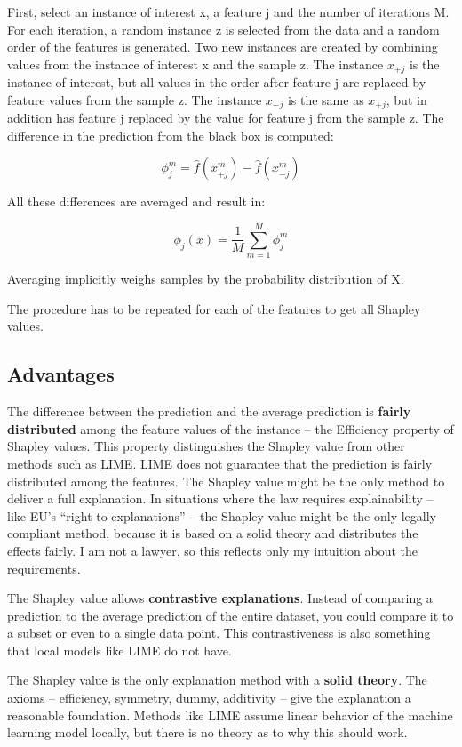 \documentclass[12pt,]{krantz}
\begin{document}
First, select an instance of interest x, a feature j and the number of
iterations M. For each iteration, a random instance z is selected from
the data and a random order of the features is generated. Two new
instances are created by combining values from the instance of interest
x and the sample z. The instance \(x_{+j}\) is the instance of interest,
but all values in the order after feature j are replaced by feature
values from the sample z. The instance \(x_{-j}\) is the same as
\(x_{+j}\), but in addition has feature j replaced by the value for
feature j from the sample z. The difference in the prediction from the
black box is computed:

\[\phi_j^{m}=\hat{f}(x^m_{+j})-\hat{f}(x^m_{-j})\]

All these differences are averaged and result in:

\[\phi_j(x)=\frac{1}{M}\sum_{m=1}^M\phi_j^{m}\]

Averaging implicitly weighs samples by the probability distribution of
X.

The procedure has to be repeated for each of the features to get all
Shapley values.

\subsection{Advantages}\label{advantages-16}

The difference between the prediction and the average prediction is
\textbf{fairly distributed} among the feature values of the instance --
the Efficiency property of Shapley values. This property distinguishes
the Shapley value from other methods such as
\protect\hyperlink{lime}{LIME}. LIME does not guarantee that the
prediction is fairly distributed among the features. The Shapley value
might be the only method to deliver a full explanation. In situations
where the law requires explainability -- like EU's ``right to
explanations'' -- the Shapley value might be the only legally compliant
method, because it is based on a solid theory and distributes the
effects fairly. I am not a lawyer, so this reflects only my intuition
about the requirements.

The Shapley value allows \textbf{contrastive explanations}. Instead of
comparing a prediction to the average prediction of the entire dataset,
you could compare it to a subset or even to a single data point. This
contrastiveness is also something that local models like LIME do not
have.

The Shapley value is the only explanation method with a \textbf{solid
theory}. The axioms -- efficiency, symmetry, dummy, additivity -- give
the explanation a reasonable foundation. Methods like LIME assume linear
behavior of the machine learning model locally, but there is no theory
as to why this should work.
\end{document}
